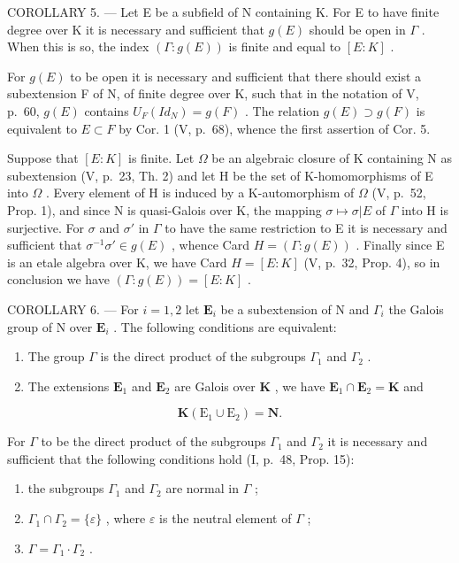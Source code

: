 COROLLARY 5. --- Let E be a subfield of N containing K. For E to have finite degree over K it is necessary and sufficient that \(g(E)\) should be open in \(\Gamma\) . When this is so, the index \((\Gamma:g(E))\) is finite and equal to \([E:K]\) .

For \(g(E)\) to be open it is necessary and sufficient that there should exist a subextension F of N, of finite degree over K, such that in the notation of V, p.~60, \(g(E)\) contains \(U_{F}(Id_{N}) = g(F)\) . The relation \(g(E) \supset g(F)\) is equivalent to \(E \subset F\) by Cor. 1 (V, p.~68), whence the first assertion of Cor. 5.

Suppose that \([E:K]\) is finite. Let \(\Omega\) be an algebraic closure of K containing N as subextension (V, p.~23, Th. 2) and let H be the set of K-homomorphisms of E into \(\Omega\) . Every element of H is induced by a K-automorphism of \(\Omega\) (V, p.~52, Prop. 1), and since N is quasi-Galois over K, the mapping \(\sigma\mapsto\sigma|E\) of \(\Gamma\) into H is surjective. For \(\sigma\) and \(\sigma'\) in \(\Gamma\) to have the same restriction to E it is necessary and sufficient that \(\sigma^{-1}\sigma'\in g(E)\) , whence Card \(H=(\Gamma:g(E))\) . Finally since E is an etale algebra over K, we have Card \(H=[E:K]\) (V, p.~32, Prop. 4), so in conclusion we have \((\Gamma:g(E))=[E:K]\) .

COROLLARY 6. --- For \(i=1,2\) let \(\mathbf{E}_{i}\) be a subextension of N and \(\Gamma_{i}\) the Galois group of N over \(\mathbf{E}_{i}\) . The following conditions are equivalent:

\begin{enumerate}
\def\labelenumi{\alph{enumi})}
\item
  The group \(\Gamma\) is the direct product of the subgroups \(\Gamma_1\) and \(\Gamma_2\) .
\item
  The extensions \(\mathbf{E}_1\) and \(\mathbf{E}_2\) are Galois over \(\mathbf{K}\) , we have \(\mathbf{E}_1 \cap \mathbf{E}_2 = \mathbf{K}\) and
\end{enumerate}

\[
\mathbf {K} \left(\mathrm{E} _ {1} \cup \mathrm{E} _ {2}\right) = \mathbf {N}.
\]

For \(\Gamma\) to be the direct product of the subgroups \(\Gamma_{1}\) and \(\Gamma_{2}\) it is necessary and sufficient that the following conditions hold (I, p.~48, Prop. 15):

\begin{enumerate}
\def\labelenumi{(\roman{enumi})}
\item
  the subgroups \(\Gamma_{1}\) and \(\Gamma_{2}\) are normal in \(\Gamma\) ;
\item
  \(\Gamma_1 \cap \Gamma_2 = \{\varepsilon\}\) , where \(\varepsilon\) is the neutral element of \(\Gamma\) ;
\item
  \(\Gamma = \Gamma_{1} \cdot \Gamma_{2}\) .
\end{enumerate}

